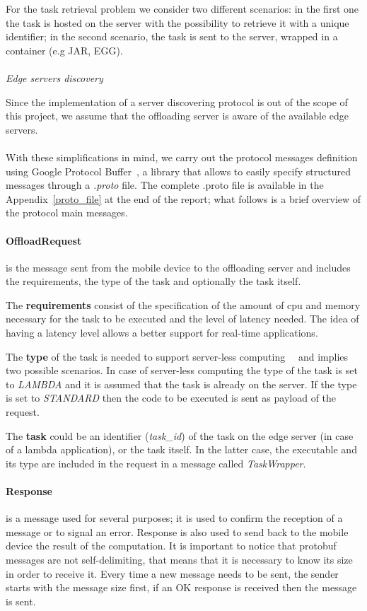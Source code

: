 For the task retrieval problem we consider two different scenarios: in the first one the task is hosted on the server with the possibility to retrieve it with a unique identifier; in the second scenario, the task is sent to the server, wrapped in a container (e.g JAR, EGG).\\\\
\textit{Edge servers discovery}

Since the implementation of a server discovering protocol is out of the scope of this project, we assume that the offloading server is aware of the available edge servers.\\\\
With these simplifications in mind, we carry out the protocol messages definition using Google Protocol Buffer~\cite{protobuf}, a library that allows to easily specify structured messages through a \textit{.proto} file. The complete .proto file is available in the Appendix~\ref{proto_file} at the end of the report; what follows is a brief overview of the protocol main messages.

\paragraph{OffloadRequest} is the message sent from the mobile device to the offloading server and includes the requirements, the type of the task and optionally the task itself.

The \textbf{requirements} consist of the specification of the amount of cpu and memory necessary for the task to be executed and the level of latency needed. The idea of having a latency level allows a better support for real-time applications.

The \textbf{type} of the task is needed to support server-less computing~\cite{hendrickson2016serverless}~\cite{fox2017status} and implies two possible scenarios. In case of server-less computing the type of the task is set to \textit{LAMBDA} and it is assumed that the task is already on the server. If the type is set to \textit{STANDARD} then the code to be executed is sent as payload of the request.

The \textbf{task} could be an identifier (\textit{task\_id}) of the task on the edge server (in case of a lambda application), or the task itself. In the latter case, the executable and its type are included in the request in a message called \textit{TaskWrapper}.

\paragraph{Response} is a message used for several purposes; it is used to confirm the reception of a message or to signal an error. Response is also used to send back to the mobile device the result of the computation. It is important to notice that protobuf messages are not self-delimiting, that means that it is necessary to know its size in order to receive it. Every time a new message needs to be sent, the sender starts with the message size first, if an OK response is received then the message is sent.

